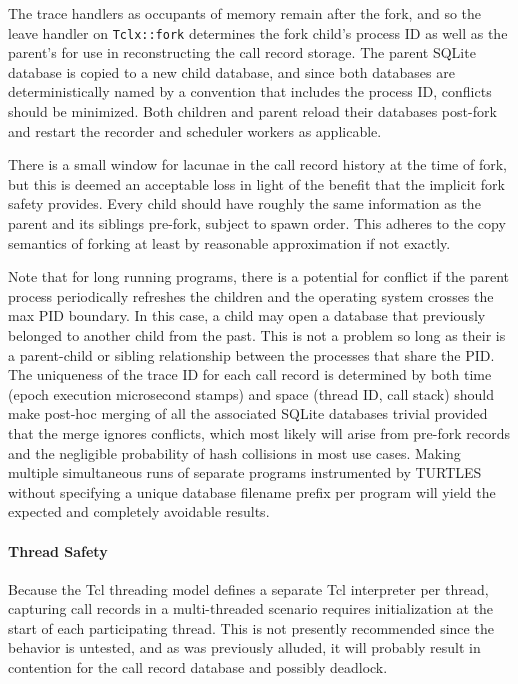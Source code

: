 \documentclass{article}[letter,10pt]
\begin{document}
{{{{        The trace handlers as occupants of memory remain after the fork, and so the leave handler on \texttt{Tclx::fork}
        determines the fork child's process ID as well as the parent's for use in reconstructing the call record storage.
        The parent SQLite database is copied to a new child database, and since both databases are deterministically
        named by a convention that includes the process ID, conflicts should be minimized. Both children and parent
        reload their databases post-fork and restart the recorder and scheduler workers as applicable.

        There is a small window for lacunae in the call record history at the time of fork, but this is deemed
        an acceptable loss in light of the benefit that the implicit fork safety provides. Every child should have
        roughly the same information as the parent and its siblings pre-fork, subject to spawn order. This adheres
        to the copy semantics of forking at least by reasonable approximation if not exactly.

        Note that for long running programs, there is a potential for conflict if the parent process periodically
        refreshes the children and the operating system crosses the max PID boundary. In this case, a child may open
        a database that previously belonged to another child from the past. This is not a problem so long as their
        is a parent-child or sibling relationship between the processes that share the PID. The uniqueness of the
        trace ID for each call record is determined by both time (epoch execution microsecond stamps) and space
        (thread ID, call stack) should make post-hoc merging of all the associated SQLite databases trivial
        provided that the merge ignores conflicts, which most likely will arise from pre-fork records and the
        negligible probability of hash collisions in most use cases. Making multiple simultaneous runs of separate
        programs instrumented by TURTLES without specifying a unique database filename prefix per program
        will yield the expected and completely avoidable results.
      }
      \paragraph{Thread Safety}{
        Because the Tcl threading model defines a separate Tcl interpreter per thread, capturing call records
        in a multi-threaded scenario requires initialization at the start of each participating thread.
        This is not presently recommended since the behavior is untested, and as was previously alluded, it will
        probably result in contention for the call record database and possibly deadlock.

}}}}
\end{document}
